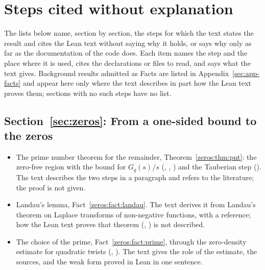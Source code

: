 \section{Steps cited without explanation}\label{sec:app-open}

The lists below name, section by section, the steps for which the text states the result and
cites the Lean text without saying why it holds, or says why only as far as the documentation of
the code does. Each item names the step and the place where it is used, cites the declarations or
files to read, and says what the text gives. Background results admitted as Facts are listed in
Appendix~\ref{sec:app-facts} and appear here only where the text describes in part how the Lean
text proves them; sections with no such steps have no list.

\begingroup\small

\subsection*{Section~\ref{sec:zeros}: From a one-sided bound to the zeros}
\begin{itemize}[leftmargin=2em,itemsep=1pt]
\item The prime number theorem for the remainder, Theorem~\ref{zeros:thm:pnt}: the zero-free
  region with the bound for $G_q(s)/s$ (,
  ,
  ) and the Tauberian step
  (). The text describes the two steps in a
  paragraph and refers to the literature; the proof is not given.
\item Landau's lemma, Fact~\ref{zeros:fact:landau}. The text derives it from Landau's theorem on
  Laplace transforms of non-negative functions, with a reference; how the Lean text proves that
  theorem (, ) is
  not described.
\item The choice of the prime, Fact~\ref{zeros:fact:prime}, through the zero-density estimate for
  quadratic twists (, ). The
  text gives the role of the estimate, the sources, and the weak form proved in Lean in one
  sentence.
\end{itemize}

